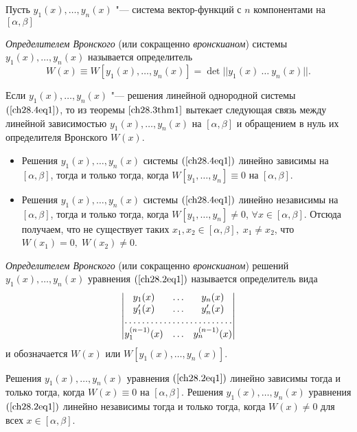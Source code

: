 Пусть $y_1(x), \ldots, y_n(x)$ "--- система вектор-функций с $n$ компонентами на $[\alpha, \beta]$
\begin{defn}
\textit{Определителем Вронского} (или сокращенно \textit{вронскианом}) системы $y_1(x), \ldots, y_n(x)$ называется определитель
$$
W(x) \equiv W[y_1(x), \ldots, y_n(x)] = \det ||y_1(x)\ \ldots\ y_n(x)||.
$$

Если $y_1(x), \ldots, y_n(x)$ "--- решения линейной однородной системы $(\ref{ch28.4eq1})$, то из теоремы $\ref{ch28.3thm1}$ вытекает следующая связь между линейной зависимостью $y_1(x), \ldots, y_n(x)$ на $[\alpha, \beta]$ и обращением в нуль их определителя Вронского $W(x)$.

\begin{itemize}
\item
Решения $y_1(x), \ldots, y_n(x)$ системы $(\ref{ch28.4eq1})$ линейно зависимы на $[\alpha, \beta]$, тогда и только тогда, когда $W[y_1, \ldots, y_n] \equiv 0$ на $[\alpha, \beta]$.
\item
Решения $y_1(x), \ldots, y_n(x)$ системы $(\ref{ch28.4eq1})$ линейно независимы на $[\alpha, \beta]$, тогда и только тогда, когда $W[y_1, \ldots, y_n] \not = 0$, $\forall x \in [\alpha, \beta]$. Отсюда получаем, что не существует таких $x_1, x_2 \in [\alpha, \beta], \; x_1 \not= x_2$, что $W(x_1) = 0, \; W(x_2) \not= 0$. 
\end{itemize}
\end{defn}

\begin{defn}
\textit{Определителем Вронского} (или сокращенно \textit{вронскианом}) решений $y_1(x), \ldots, y_n(x)$ уравнения $(\ref{ch28.2eq1})$ называется определитель вида
\begin{equation}
\begin{vmatrix}
y_1(x) & \ldots & y_n(x) \\
y'_1(x) & \ldots & y'_n(x) \\
\hdotsfor{3} \\
y^{(n - 1)}_1(x) & \ldots & y^{(n - 1)}_n(x)
\end{vmatrix}
\end{equation}
и обозначается $W(x)$ или $W[y_1(x), \ldots, y_n(x)]$.
\end{defn}

\begin{thm} \label{ch28.3thm3}
Решения $y_1(x), \ldots, y_n(x)$ уравнения $(\ref{ch28.2eq1})$ линейно зависимы тогда и только тогда, когда $W(x) \equiv 0$ на $[\alpha, \beta]$. Решения $y_1(x), \ldots, y_n(x)$ уравнения $(\ref{ch28.2eq1})$ линейно независимы тогда и только тогда, когда $W(x) \not= 0$ для всех $x \in [\alpha, \beta]$.
\end{thm}

